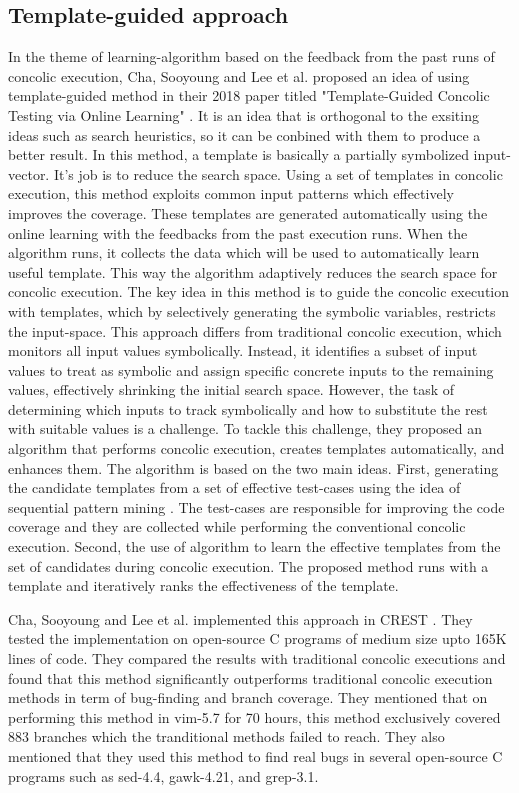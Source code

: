 \documentclass[	runningheads,
				a4paper]{llncs}
\begin{document}

\subsection{Template-guided approach}
In the theme of learning-algorithm based on the feedback from the past runs of concolic execution, Cha, Sooyoung and Lee et al. proposed an idea of using template-guided method in their 2018 paper titled "Template-Guided Concolic Testing via Online Learning" \cite{cha2018template}. It is an idea that is orthogonal to the exsiting ideas such as search heuristics, so it can be conbined with them to produce a better result. In this method, a template is basically a partially symbolized input-vector. It's job is to reduce the search space. 
Using a set of templates in concolic execution, this method exploits common input patterns which effectively improves the coverage.
These templates are generated automatically using the online learning with the feedbacks from the past execution runs. When the algorithm runs, it collects the data which will be used to automatically learn useful template. This way the algorithm adaptively reduces the search space for concolic execution. The key idea in this method is to guide the concolic execution with templates, which by selectively generating the symbolic variables, restricts the input-space. This approach differs from traditional concolic execution, which monitors all input values symbolically. Instead, it identifies a subset of input values to treat as symbolic and assign specific concrete inputs to the remaining values, effectively shrinking the initial search space. However, the task of determining which inputs to track symbolically and how to substitute the rest with suitable values is a challenge. To tackle this challenge, they proposed an algorithm that performs concolic execution, creates templates automatically, and enhances them. The algorithm is based on the two main ideas. First, generating the candidate templates from a set of effective test-cases using the idea of sequential pattern mining \cite{fumarola2016clofast}. The test-cases are responsible for improving the code coverage and they are collected while performing the conventional concolic execution. Second, the use of algorithm to learn the effective templates from the set of candidates during concolic execution. The proposed method runs with a template and iteratively ranks the effectiveness of the template. 

Cha, Sooyoung and Lee et al. implemented this approach \cite{cha2018template} in CREST \cite{kousik2008heuristic}. They tested the implementation on open-source C programs of medium size upto 165K lines of code. They compared the results with traditional concolic executions and found that this method significantly outperforms traditional concolic execution methods in term of bug-finding and branch coverage. They mentioned that on performing this method in vim-5.7 for 70 hours, this method exclusively covered 883 branches which the tranditional methods failed to reach. They also mentioned that they used this method to find real bugs in several open-source C programs such as sed-4.4, gawk-4.21, and grep-3.1.
\end{document}
